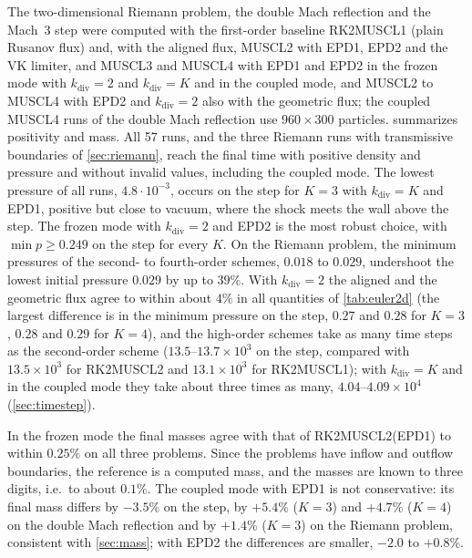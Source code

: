 \documentclass[11pt,a4paper]{article}
\numberwithin{equation}{section}
\begin{document}
The two-dimensional Riemann problem, the double Mach reflection and the Mach~3 step were computed with the first-order baseline RK2MUSCL1 (plain Rusanov flux) and, with the aligned flux, MUSCL2 with EPD1, EPD2 and the VK limiter, and MUSCL3 and MUSCL4 with EPD1 and EPD2 in the frozen mode with $k_{\mathrm{div}}=2$ and $k_{\mathrm{div}}=K$ and in the coupled mode, and MUSCL2 to MUSCL4 with EPD2 and $k_{\mathrm{div}}=2$ also with the geometric flux; the coupled MUSCL4 runs of the double Mach reflection use $960\times300$ particles.  summarizes positivity and mass. All 57 runs, and the three Riemann runs with transmissive boundaries of \cref{sec:riemann}, reach the final time with positive density and pressure and without invalid values, including the coupled mode. The lowest pressure of all runs, $4.8\cdot10^{-3}$, occurs on the step for $K=3$ with $k_{\mathrm{div}}=K$ and EPD1, positive but close to vacuum, where the shock meets the wall above the step. The frozen mode with $k_{\mathrm{div}}=2$ and EPD2 is the most robust choice, with $\min p\ge0.249$ on the step for every $K$. On the Riemann problem, the minimum pressures of the second- to fourth-order schemes, $0.018$ to $0.029$, undershoot the lowest initial pressure $0.029$ by up to $39\%$. With $k_{\mathrm{div}}=2$ the aligned and the geometric flux agree to within about $4\%$ in all quantities of \cref{tab:euler2d} (the largest difference is in the minimum pressure on the step, $0.27$ and $0.28$ for $K=3$, $0.28$ and $0.29$ for $K=4$), and the high-order schemes take as many time steps as the second-order scheme ($13.5$--$13.7\times10^3$ on the step, compared with $13.5\times10^3$ for RK2MUSCL2 and $13.1\times10^3$ for RK2MUSCL1); with $k_{\mathrm{div}}=K$ and in the coupled mode they take about three times as many, $4.04$--$4.09\times10^4$ (\cref{sec:timestep}).

In the frozen mode the final masses agree with that of RK2MUSCL2(EPD1) to within $0.25\%$ on all three problems. Since the problems have inflow and outflow boundaries, the reference is a computed mass, and the masses are known to three digits, i.e.\ to about $0.1\%$. The coupled mode with EPD1 is not conservative: its final mass differs by $-3.5\%$ on the step, by $+5.4\%$ ($K=3$) and $+4.7\%$ ($K=4$) on the double Mach reflection and by $+1.4\%$ ($K=3$) on the Riemann problem, consistent with \cref{sec:mass}; with EPD2 the differences are smaller, $-2.0$ to $+0.8\%$.
\end{document}
